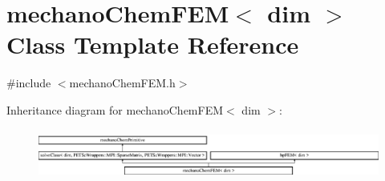 \section{mechano\+Chem\+F\+EM$<$ dim $>$ Class Template Reference}
\label{classmechano_chem_f_e_m}


{\ttfamily \#include $<$mechano\+Chem\+F\+E\+M.\+h$>$}

Inheritance diagram for mechano\+Chem\+F\+EM$<$ dim $>$\+:\begin{figure}[H]
\begin{center}
\leavevmode
\includegraphics[height=1.650295cm]{classmechano_chem_f_e_m}
\end{center}
\end{figure}
